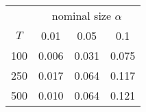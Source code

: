 % 
\begin{tabular}{cccc}
  \hline
  & \multicolumn{3}{c}{nominal size $\alpha$} \\
 $T$ & 0.01 & 0.05 & 0.1 \\
 \hline
100 & 0.006 & 0.031 & 0.075 \\ 
  250 & 0.017 & 0.064 & 0.117 \\ 
  500 & 0.010 & 0.064 & 0.121 \\ 
   \hline
\end{tabular}
